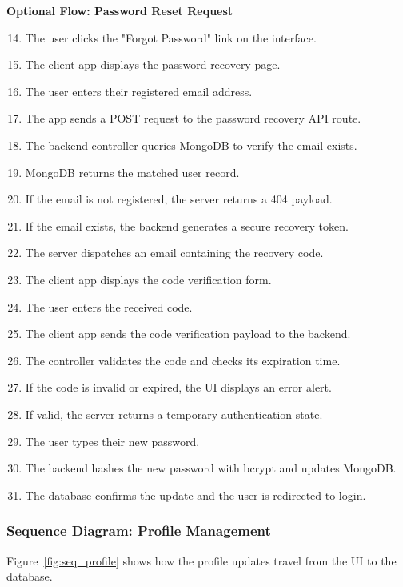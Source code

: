 \documentclass[12pt,a4paper]{report}
\begin{document}
  \textbf{Optional Flow: Password Reset Request}
  \begin{enumerate}
      \setcounter{enumi}{13}
      \item The user clicks the "Forgot Password" link on the interface.
      \item The client app displays the password recovery page.
      \item The user enters their registered email address.
      \item The app sends a POST request to the password recovery API route.
      \item The backend controller queries MongoDB to verify the email exists.
      \item MongoDB returns the matched user record.
      \item If the email is not registered, the server returns a 404 payload.
      \item If the email exists, the backend generates a secure recovery token.
      \item The server dispatches an email containing the recovery code.
      \item The client app displays the code verification form.
      \item The user enters the received code.
      \item The client app sends the code verification payload to the backend.
      \item The controller validates the code and checks its expiration time.
      \item If the code is invalid or expired, the UI displays an error alert.
      \item If valid, the server returns a temporary authentication state.
      \item The user types their new password.
      \item The backend hashes the new password with bcrypt and updates MongoDB.
      \item The database confirms the update and the user is redirected to login.
  \end{enumerate}
 
 \subsubsection{Sequence Diagram: Profile Management}
 
Figure~\ref{fig:seq_profile} shows how the profile updates travel from the UI to the database.
 
\end{document}
